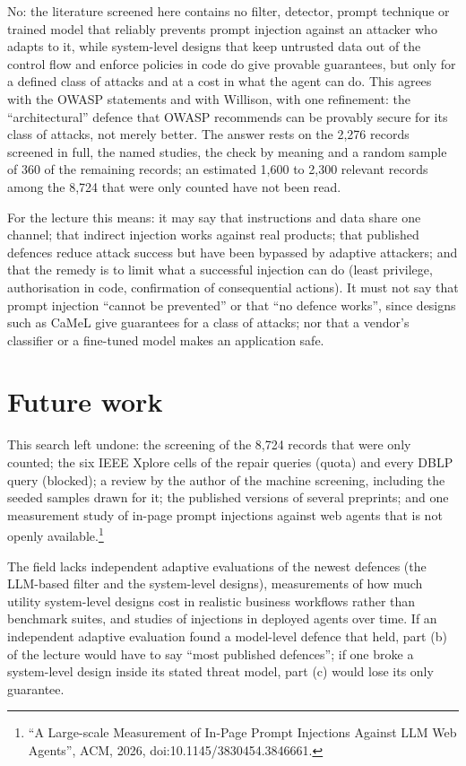 No: the literature screened here contains no filter, detector, prompt
technique or trained model that reliably prevents prompt injection
against an attacker who adapts to it, while system-level designs that
keep untrusted data out of the control flow and enforce policies in code
do give provable guarantees, but only for a defined class of attacks and
at a cost in what the agent can do. This agrees with the OWASP
statements\autocite{OWASP2025LLM,OWASP2026LLM} and with
Willison\autocite{Willison2025Trifecta}, with one refinement: the
\enquote{architectural} defence that OWASP recommends can be provably
secure for its class of attacks, not merely better. The answer rests on
the 2,276 records screened in full, the named studies, the check by
meaning and a random sample of 360 of the remaining records; an estimated
1,600 to 2,300 relevant records among the 8,724 that were only counted
have not been read.

For the lecture this means: it may say that instructions and data share
one channel; that indirect injection works against real products; that
published defences reduce attack success but have been bypassed by
adaptive attackers; and that the remedy is to limit what a successful
injection can do (least privilege, authorisation in code, confirmation
of consequential actions). It must not say that prompt injection
\enquote{cannot be prevented} or that \enquote{no defence works}, since
designs such as CaMeL give guarantees for a class of attacks; nor that a
vendor's classifier or a fine-tuned model makes an application safe.

\section{Future work}
\label{prompt-injection:future}

This search left undone: the screening of the 8,724 records that were
only counted; the six IEEE Xplore cells of the repair queries (quota) and
every DBLP query (blocked); a review by the author of the machine
screening, including the seeded samples drawn for it; the published
versions of several preprints; and one measurement study of in-page
prompt injections against web agents that is not openly
available.\footnote{\enquote{A Large-scale Measurement of In-Page Prompt
Injections Against LLM Web Agents}, ACM, 2026, doi:10.1145/3830454.3846661.}

The field lacks independent adaptive evaluations of the newest defences
(the LLM-based filter\autocite{Shi2025PromptArmor} and the system-level
designs), measurements of how much utility system-level designs cost in
realistic business workflows rather than benchmark suites, and studies of
injections in deployed agents over time. If an independent adaptive
evaluation found a model-level defence that held, part (b) of the lecture
would have to say \enquote{most published defences}; if one broke a
system-level design inside its stated threat model, part (c) would lose
its only guarantee.

